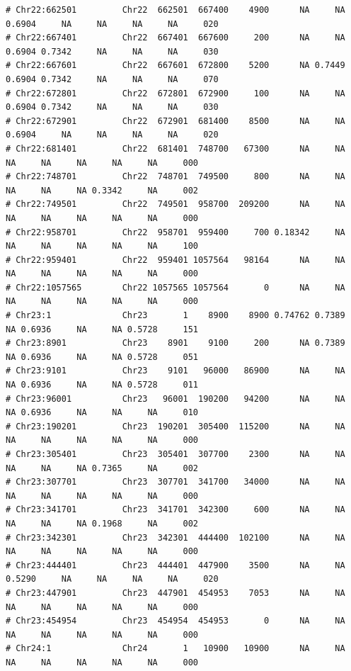 \documentclass{article}\usepackage[]{graphicx}\usepackage[]{color}
\makeatletter
\newenvironment{kframe}{%
 \def\at@end@of@kframe{}%
 \ifinner\ifhmode%
  \def\at@end@of@kframe{\end{minipage}}%
  \begin{minipage}{\columnwidth}%
 \fi\fi%
 \def\FrameCommand##1{\hskip\@totalleftmargin \hskip-\fboxsep
 \colorbox{shadecolor}{##1}\hskip-\fboxsep
     \hskip-\linewidth \hskip-\@totalleftmargin \hskip\columnwidth}%
 \MakeFramed {\advance\hsize-\width
   \@totalleftmargin\z@ \linewidth\hsize
   \@setminipage}}%
 {\par\unskip\endMakeFramed%
 \at@end@of@kframe}
\newenvironment{knitrout}{}{} %
\makeatother
\begin{document}
\begin{knitrout}
\begin{kframe}
\begin{verbatim}
# Chr22:662501         Chr22  662501  667400    4900      NA     NA 0.6904     NA     NA     NA     NA     020
# Chr22:667401         Chr22  667401  667600     200      NA     NA 0.6904 0.7342     NA     NA     NA     030
# Chr22:667601         Chr22  667601  672800    5200      NA 0.7449 0.6904 0.7342     NA     NA     NA     070
# Chr22:672801         Chr22  672801  672900     100      NA     NA 0.6904 0.7342     NA     NA     NA     030
# Chr22:672901         Chr22  672901  681400    8500      NA     NA 0.6904     NA     NA     NA     NA     020
# Chr22:681401         Chr22  681401  748700   67300      NA     NA     NA     NA     NA     NA     NA     000
# Chr22:748701         Chr22  748701  749500     800      NA     NA     NA     NA     NA 0.3342     NA     002
# Chr22:749501         Chr22  749501  958700  209200      NA     NA     NA     NA     NA     NA     NA     000
# Chr22:958701         Chr22  958701  959400     700 0.18342     NA     NA     NA     NA     NA     NA     100
# Chr22:959401         Chr22  959401 1057564   98164      NA     NA     NA     NA     NA     NA     NA     000
# Chr22:1057565        Chr22 1057565 1057564       0      NA     NA     NA     NA     NA     NA     NA     000
# Chr23:1              Chr23       1    8900    8900 0.74762 0.7389     NA 0.6936     NA     NA 0.5728     151
# Chr23:8901           Chr23    8901    9100     200      NA 0.7389     NA 0.6936     NA     NA 0.5728     051
# Chr23:9101           Chr23    9101   96000   86900      NA     NA     NA 0.6936     NA     NA 0.5728     011
# Chr23:96001          Chr23   96001  190200   94200      NA     NA     NA 0.6936     NA     NA     NA     010
# Chr23:190201         Chr23  190201  305400  115200      NA     NA     NA     NA     NA     NA     NA     000
# Chr23:305401         Chr23  305401  307700    2300      NA     NA     NA     NA     NA 0.7365     NA     002
# Chr23:307701         Chr23  307701  341700   34000      NA     NA     NA     NA     NA     NA     NA     000
# Chr23:341701         Chr23  341701  342300     600      NA     NA     NA     NA     NA 0.1968     NA     002
# Chr23:342301         Chr23  342301  444400  102100      NA     NA     NA     NA     NA     NA     NA     000
# Chr23:444401         Chr23  444401  447900    3500      NA     NA 0.5290     NA     NA     NA     NA     020
# Chr23:447901         Chr23  447901  454953    7053      NA     NA     NA     NA     NA     NA     NA     000
# Chr23:454954         Chr23  454954  454953       0      NA     NA     NA     NA     NA     NA     NA     000
# Chr24:1              Chr24       1   10900   10900      NA     NA     NA     NA     NA     NA     NA     000

\end{verbatim}
\end{kframe}
\end{knitrout}
\end{document}
